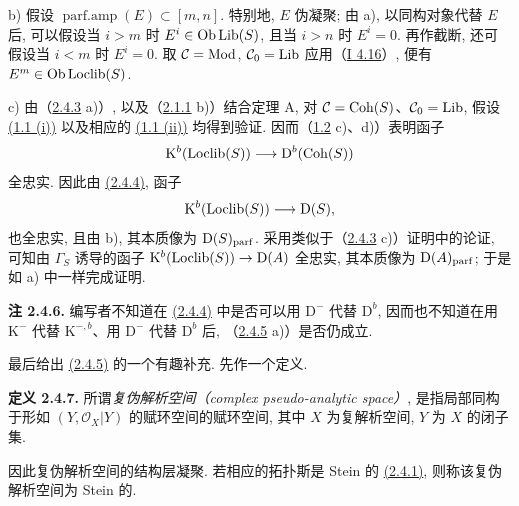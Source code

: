 b) 假设 $\operatorname{parf.amp}(E)\subset[m,n]$. 特别地, $E$ 伪凝聚; 由 a), 以同构对象代替 $E$ 后, 可以假设当 $i>m$ 时 $E^i\in\Ob\Lib(S)$, 且当 $i>n$ 时 $E^i=0$. 再作截断, 还可假设当 $i<m$ 时 $E^i=0$. 取 $\mathcal C=\Mod$, $\mathcal C_0=\Lib$ 应用（\hyperlink{sga6.e01.lem.4-16}{I 4.16}）, 便有 $E^m\in\Ob\Loclib(S)$.

c) 由（\hyperlink{sga6.e02.lem.2-4-3}{2.4.3} a)）, 以及（\hyperlink{sga6.e02.lem.2-1-1}{2.1.1} b)）结合定理 A, 对 $\mathcal C=\Coh(S)$、$\mathcal C_0=\Lib$, 假设 \hyperlink{sga6.e02.prop.1-1}{(1.1 (i))} 以及相应的 \hyperlink{sga6.e02.prop.1-1}{(1.1 (ii))} 均得到验证. 因而（\hyperlink{sga6.e02.prop.1-2}{1.2} c)、d)）表明函子
\[
\mathrm K^b(\Loclib(S))\longrightarrow\mathrm D^b(\Coh(S))
\]
全忠实. 因此由 \hyperlink{sga6.e02.lem.2-4-4}{(2.4.4)}, 函子
\[
\mathrm K^b(\Loclib(S))\longrightarrow\mathrm D(S),
\]
也全忠实, 且由 b), 其本质像为 $\mathrm D(S)_{\parf}$. 采用类似于（\hyperlink{sga6.e02.lem.2-4-3}{2.4.3} c)）证明中的论证, 可知由 $\Gamma_S$ 诱导的函子 $\mathrm K^b(\Loclib(S))\to\mathrm D(A)$ 全忠实, 其本质像为 $\mathrm D(A)_{\parf}$; 于是如 a) 中一样完成证明.

\textbf{注 2.4.6.} 编写者不知道在 \hyperlink{sga6.e02.lem.2-4-4}{(2.4.4)} 中是否可以用 $\mathrm D^{-}$ 代替 $\mathrm D^b$, 因而也不知道在用 $\mathrm K^{-}$ 代替 $\mathrm K^{-,b}$、用 $\mathrm D^{-}$ 代替 $\mathrm D^b$ 后, （\hyperlink{sga6.e02.prop.2-4-5}{2.4.5} a)）是否仍成立.

最后给出 \hyperlink{sga6.e02.prop.2-4-5}{(2.4.5)} 的一个有趣补充. 先作一个定义.

\textbf{定义 2.4.7.} 所谓\emph{复伪解析空间（complex pseudo-analytic space）}, 是指局部同构于形如 $(Y,\mathcal O_X|Y)$ 的赋环空间的赋环空间, 其中 $X$ 为复解析空间, $Y$ 为 $X$ 的闭子集.

因此复伪解析空间的结构层凝聚. 若相应的拓扑斯是 Stein 的 \hyperlink{sga6.e02.def.2-4-1}{(2.4.1)}, 则称该复伪解析空间为 Stein 的.



\providecommand{\Qcoh}{\operatorname{Qcoh}}
\providecommand{\Mod}{\operatorname{Mod}}
\providecommand{\Coh}{\operatorname{Coh}}
\providecommand{\Ob}{\operatorname{Ob}}
\providecommand{\Hom}{\operatorname{Hom}}
\providecommand{\Ext}{\operatorname{Ext}}
\providecommand{\Spec}{\operatorname{Spec}}
\providecommand{\qcoh}{\mathrm{qcoh}}
\providecommand{\parf}{\mathrm{parf}}
\providecommand{\coh}{\mathrm{coh}}
\providecommand{\Loclib}{\operatorname{Loclib}}
\providecommand{\Lib}{\operatorname{Lib}}
\providecommand{\im}{\operatorname{Im}}

